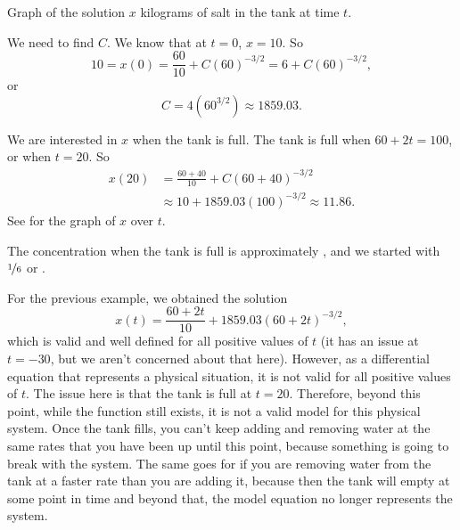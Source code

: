 \begin{exampleSol}
\begin{mywrapfig}{3.25in}
\capstart
{}
\caption{Graph of the solution $x$ kilograms of salt in the tank at time
$t$.\label{linear-salt-graph:fig}}
\end{mywrapfig}
%
%
We need to find $C$.  We know that at $t=0$, $x=10$.  So
\begin{equation*}
10 = x(0)
=
\frac{60}{10}
+C{(60)}^{-3/2}
=
6
+C{(60)}^{-3/2} ,
\end{equation*}
or
\begin{equation*}
C=4 ({60}^{3/2}) \approx 1859.03 .
\end{equation*}

We are interested in $x$ when the tank is full.  The tank is
full when $60+2t = 100$, or when $t=20$.  So
\begin{equation*}
\begin{split}
x(20) & = 
\frac{60+40}{10}
+C{(60+40)}^{-3/2}
\\
& \approx
10
+1859.03 {(100)}^{-3/2}
\approx
11.86 .
\end{split}
\end{equation*}
See  for the graph of $x$ over $t$.

The concentration when the tank is full is approximately
, and we started
with $\nicefrac{1}{6}$ or .
\end{exampleSol}

For the previous example, we obtained the solution 
\begin{equation*}
x(t) = \frac{60 + 2t}{10} + 1859.03(60+2t)^{-3/2},
\end{equation*}
which is valid and well defined for all positive values of $t$ (it has an issue at $t=-30$, but we aren't concerned about that here). However, as a differential equation that represents a physical situation, it is not valid for all positive values of $t$. The issue here is that the tank is full at $t=20$. Therefore, beyond this point, while the function still exists, it is not a valid model for this physical system. Once the tank fills, you can't keep adding and removing water at the same rates that you have been up until this point, because something is going to break with the system. The same goes for if you are removing water from the tank at a faster rate than you are adding it, because then the tank will empty at some point in time and beyond that, the model equation no longer represents the system.  

